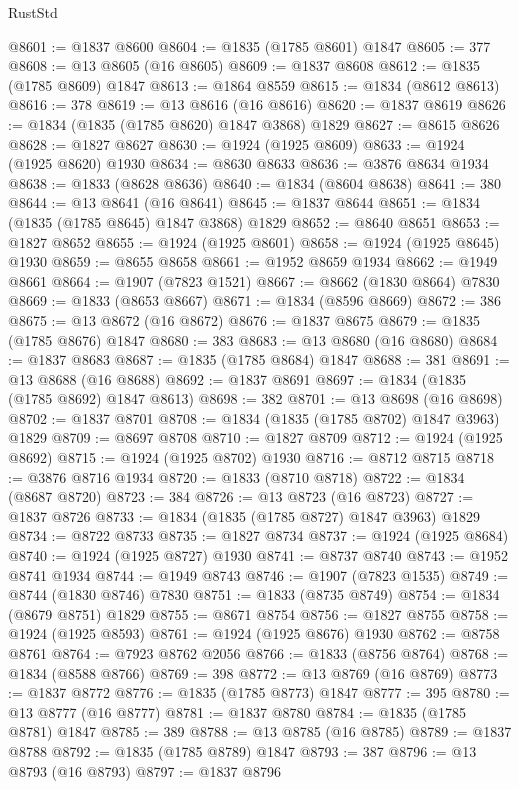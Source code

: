 \begin{lexlean}{RustStd}
\begin{coremodule}
@8601 := @1837 @8600
@8604 := @1835 (@1785 @8601) @1847
@8605 := 377
@8608 := @13 @8605 (@16 @8605)
@8609 := @1837 @8608
@8612 := @1835 (@1785 @8609) @1847
@8613 := @1864 @8559
@8615 := @1834 (@8612 @8613)
@8616 := 378
@8619 := @13 @8616 (@16 @8616)
@8620 := @1837 @8619
@8626 := @1834 (@1835 (@1785 @8620) @1847 @3868) @1829
@8627 := @8615 @8626
@8628 := @1827 @8627
@8630 := @1924 (@1925 @8609)
@8633 := @1924 (@1925 @8620) @1930
@8634 := @8630 @8633
@8636 := @3876 @8634 @1934
@8638 := @1833 (@8628 @8636)
@8640 := @1834 (@8604 @8638)
@8641 := 380
@8644 := @13 @8641 (@16 @8641)
@8645 := @1837 @8644
@8651 := @1834 (@1835 (@1785 @8645) @1847 @3868) @1829
@8652 := @8640 @8651
@8653 := @1827 @8652
@8655 := @1924 (@1925 @8601)
@8658 := @1924 (@1925 @8645) @1930
@8659 := @8655 @8658
@8661 := @1952 @8659 @1934
@8662 := @1949 @8661
@8664 := @1907 (@7823 @1521)
@8667 := @8662 (@1830 @8664) @7830
@8669 := @1833 (@8653 @8667)
@8671 := @1834 (@8596 @8669)
@8672 := 386
@8675 := @13 @8672 (@16 @8672)
@8676 := @1837 @8675
@8679 := @1835 (@1785 @8676) @1847
@8680 := 383
@8683 := @13 @8680 (@16 @8680)
@8684 := @1837 @8683
@8687 := @1835 (@1785 @8684) @1847
@8688 := 381
@8691 := @13 @8688 (@16 @8688)
@8692 := @1837 @8691
@8697 := @1834 (@1835 (@1785 @8692) @1847 @8613)
@8698 := 382
@8701 := @13 @8698 (@16 @8698)
@8702 := @1837 @8701
@8708 := @1834 (@1835 (@1785 @8702) @1847 @3963) @1829
@8709 := @8697 @8708
@8710 := @1827 @8709
@8712 := @1924 (@1925 @8692)
@8715 := @1924 (@1925 @8702) @1930
@8716 := @8712 @8715
@8718 := @3876 @8716 @1934
@8720 := @1833 (@8710 @8718)
@8722 := @1834 (@8687 @8720)
@8723 := 384
@8726 := @13 @8723 (@16 @8723)
@8727 := @1837 @8726
@8733 := @1834 (@1835 (@1785 @8727) @1847 @3963) @1829
@8734 := @8722 @8733
@8735 := @1827 @8734
@8737 := @1924 (@1925 @8684)
@8740 := @1924 (@1925 @8727) @1930
@8741 := @8737 @8740
@8743 := @1952 @8741 @1934
@8744 := @1949 @8743
@8746 := @1907 (@7823 @1535)
@8749 := @8744 (@1830 @8746) @7830
@8751 := @1833 (@8735 @8749)
@8754 := @1834 (@8679 @8751) @1829
@8755 := @8671 @8754
@8756 := @1827 @8755
@8758 := @1924 (@1925 @8593)
@8761 := @1924 (@1925 @8676) @1930
@8762 := @8758 @8761
@8764 := @7923 @8762 @2056
@8766 := @1833 (@8756 @8764)
@8768 := @1834 (@8588 @8766)
@8769 := 398
@8772 := @13 @8769 (@16 @8769)
@8773 := @1837 @8772
@8776 := @1835 (@1785 @8773) @1847
@8777 := 395
@8780 := @13 @8777 (@16 @8777)
@8781 := @1837 @8780
@8784 := @1835 (@1785 @8781) @1847
@8785 := 389
@8788 := @13 @8785 (@16 @8785)
@8789 := @1837 @8788
@8792 := @1835 (@1785 @8789) @1847
@8793 := 387
@8796 := @13 @8793 (@16 @8793)
@8797 := @1837 @8796

\end{coremodule}
\end{lexlean}
